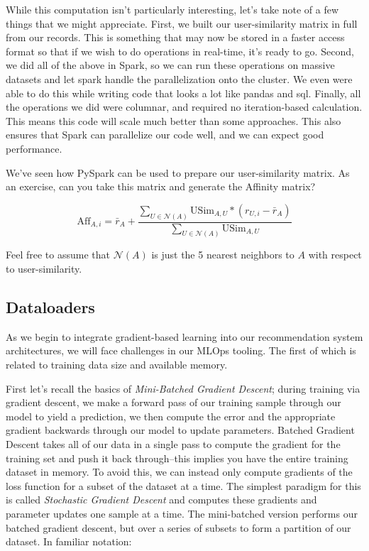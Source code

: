 While this computation isn't particularly interesting, let's take note of a few things that we might appreciate. First, we built our user-similarity matrix in full from our records. This is something that may now be stored in a faster access format so that if we wish to do operations in real-time, it's ready to go. Second, we did all of the above in Spark, so we can run these operations on massive datasets and let spark handle the parallelization onto the cluster. We even were able to do this while writing code that looks a lot like pandas and sql. Finally, all the operations we did were columnar, and required no iteration-based calculation. This means this code will scale much better than some approaches. This also ensures that Spark can parallelize our code well, and we can expect good performance.

We've seen how PySpark can be used to prepare our user-similarity matrix. As an exercise, can you take this matrix and generate the Affinity matrix?

\begin{equation}
    \mathrm{Aff}_{A,i}=\bar{r}_A+\frac{\sum_{U\in \mathcal{N}(A)}\mathrm{USim}_{A,U}*(r_{U,i}-\bar{r}_A)}{\sum_{U\in \mathcal{N}(A)}\mathrm{USim}_{A,U}}
\end{equation}

Feel free to assume that $\mathcal{N}(A)$ is just the 5 nearest neighbors to $A$ with respect to user-similarity.

\subsection{Dataloaders}

As we begin to integrate gradient-based learning into our recommendation system architectures, we will face challenges in our MLOps tooling. The first of which is related to training data size and available memory. 

First let's recall the basics of \emph{Mini-Batched Gradient Descent}; during training via gradient descent, we make a forward pass of our training sample through our model to yield a prediction, we then compute the error and the appropriate gradient backwards through our model to update parameters. Batched Gradient Descent takes all of our data in a single pass to compute the gradient for the training set and push it back through–this implies you have the entire training dataset in memory. To avoid this, we can instead only compute gradients of the loss function for a subset of the dataset at a time. The simplest paradigm for this is called \emph{Stochastic Gradient Descent} and computes these gradients and parameter updates one sample at a time. The mini-batched version performs our batched gradient descent, but over a series of subsets to form a partition of our dataset. In familiar notation:

